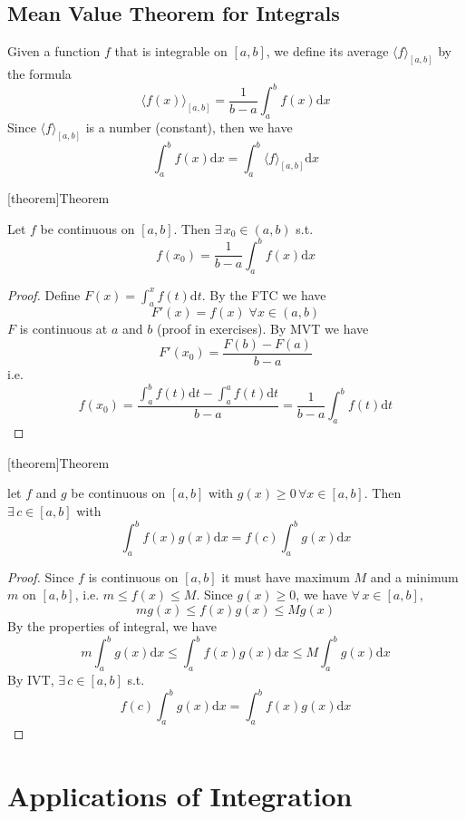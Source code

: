 \documentclass[12pt]{report}
\theoremstyle{definition}
\begin{document}
\subsection{Mean Value Theorem for Integrals}
Given a function $f$ that is integrable on $[a,b]$, we define its average $\langle f \rangle_{[a,b]}$ by the formula \[
    \langle f(x) \rangle_{[a,b]} = \frac{1}{b-a} \int_a^{b} f(x)\mathrm{d}x
\]
Since $\langle f \rangle_{[a,b]}$ is a number (constant), then we have \[
    \int_a^{b} f(x) \mathrm{d}x = \int_a^{b} \langle f \rangle_{[a,b]} \mathrm{d}x
\]

[theorem]{Theorem}
\begin{MVT for Integrals}
    Let $f$ be continuous on $[a,b]$. Then $\exists\, x_0 \in (a,b)$ s.t. \[
        f(x_0) = \frac{1}{b-a} \int_a^{b} f(x) \mathrm{d}x
    \]
\end{MVT for Integrals}
\begin{proof}
    Define $F(x) = \int_a^{x} f(t)\mathrm{d}t$. By the FTC we have \[
    F'(x) = f(x) \; \forall x \in (a,b)
    \]
    $F$ is continuous at $a$ and $b$ (proof in exercises). By MVT we have \[
        F'(x_0) = \frac{F(b) - F(a)}{b - a}
    \]i.e.\[
    f(x_0) = \frac{\int_a^{b}f(t)\mathrm{d}t - \int_a^{a}f(t)\mathrm{d}t}{b - a} = \frac{1}{b-a} \int_a^{b}f(t)\mathrm{d}t
    \]
\end{proof}

[theorem]{Theorem}
\begin{Generalized MVT for Integrals}
    let $f$ and $g$ be continuous on $[a,b]$ with $g(x) \ge 0 \,\forall x \in [a,b]$. Then $\exists \,c\in [a,b]$ with \[
        \int_a^{b} f(x)g(x)\mathrm{d}x = f(c)\int_a^{b} g(x)\mathrm{d}x
    \]
\end{Generalized MVT for Integrals}
\begin{proof}
    Since $f$ is continuous on $[a,b]$ it must have maximum $M$ and a minimum $m$ on $[a,b]$, i.e. $m \le f(x) \le M$.
    Since $g(x) \ge 0$, we have $\forall \, x \in [a,b]$, \[
        mg(x) \le f(x)g(x) \le Mg(x)
    \]
    By the properties of integral, we have \[
        m\int_a^{b} g(x)\mathrm{d}x \le \int_a^{b} f(x)g(x)\mathrm{d}x \le M\int_a^{b} g(x)\mathrm{d}x
    \]
    By IVT, $\exists \, c \in [a,b]$ s.t. \[
        f(c)\int_a^{b} g(x)\mathrm{d}x = \int_a^{b} f(x)g(x)\mathrm{d}x
    \]
\end{proof}

\section{Applications of Integration}
\end{document}
